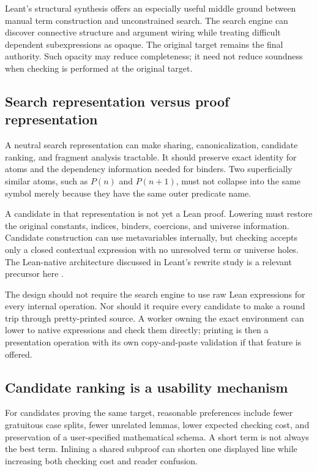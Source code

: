 \documentclass[11pt,a4paper]{article}
\theoremstyle{remark}
\begin{document}
Leant's structural synthesis offers an especially useful middle ground between manual term construction and unconstrained search. The search engine can discover connective structure and argument wiring while treating difficult dependent subexpressions as opaque. The original target remains the final authority. Such opacity may reduce completeness; it need not reduce soundness when checking is performed at the original target.

\subsection{Search representation versus proof representation}

A neutral search representation can make sharing, canonicalization, candidate ranking, and fragment analysis tractable. It should preserve exact identity for atoms and the dependency information needed for binders. Two superficially similar atoms, such as \(P(n)\) and \(P(n+1)\), must not collapse into the same symbol merely because they have the same outer predicate name.

A candidate in that representation is not yet a Lean proof. Lowering must restore the original constants, indices, binders, coercions, and universe information. Candidate construction can use metavariables internally, but checking accepts only a closed contextual expression with no unresolved term or universe holes. The Lean-native architecture discussed in Leant's rewrite study is a relevant precursor here \cite{leant-rewrite}.

The design should not require the search engine to use raw Lean expressions for every internal operation. Nor should it require every candidate to make a round trip through pretty-printed source. A worker owning the exact environment can lower to native expressions and check them directly; printing is then a presentation operation with its own copy-and-paste validation if that feature is offered.

\subsection{Candidate ranking is a usability mechanism}

For candidates proving the same target, reasonable preferences include fewer gratuitous case splits, fewer unrelated lemmas, lower expected checking cost, and preservation of a user-specified mathematical schema. A short term is not always the best term. Inlining a shared subproof can shorten one displayed line while increasing both checking cost and reader confusion.
\end{document}
